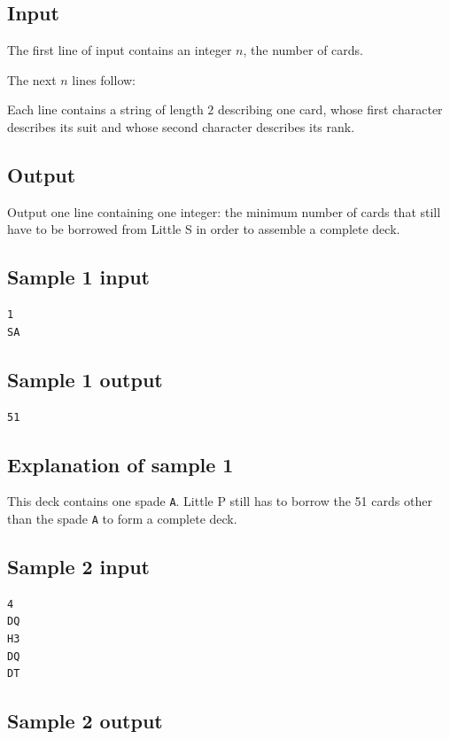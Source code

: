 \documentclass[11pt]{article}
\begin{document}
\subsection*{Input}

The first line of input contains an integer $n$, the number of cards.

The next $n$ lines follow:

Each line contains a string of length $2$ describing one card, whose first
character describes its suit and whose second character describes its rank.

\subsection*{Output}

Output one line containing one integer: the minimum number of cards that
still have to be borrowed from Little S in order to assemble a complete deck.

\subsection*{Sample 1 input}

\begin{verbatim}
1
SA
\end{verbatim}

\subsection*{Sample 1 output}

\begin{verbatim}
51
\end{verbatim}

\subsection*{Explanation of sample 1}

This deck contains one spade \texttt{A}.
Little P still has to borrow the 51 cards other than the spade \texttt{A}
to form a complete deck.

\subsection*{Sample 2 input}

\begin{verbatim}
4
DQ
H3
DQ
DT
\end{verbatim}

\subsection*{Sample 2 output}
\end{document}
